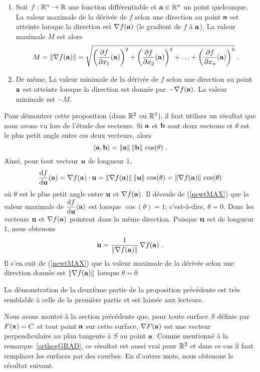{\begin{focus}{\prp}
\begin{enumerate}
\item Soit $f:\mathbb{R}^n\rightarrow \mathbb{R}$ une fonction différentiable et
$\mathbf{a} \in \mathbb{R}^n$ un point quelconque.  La valeur maximale de la dérivée de
$f$ selon une direction au point $\mathbf{a}$ est atteinte lorsque la direction
est $\nabla f(\mathbf{a})$ (le gradient de $f$ à $\mathbf{a}$).  La valeur maximale
$M$ est alors
\[
M = \|\nabla f(\mathbf{a}) \| =
\sqrt{\left(\frac{\partial f}{\partial x_1}(\mathbf{a})\right)^2 +
\left(\frac{\partial f}{\partial x_2}(\mathbf{a})\right)^2 + \ldots +
\left(\frac{\partial f}{\partial x_n}(\mathbf{a})\right)^2 } \; .
\]
\item De même, La valeur minimale de la dérivée de $f$ selon une direction au
point $\mathbf{a}$ est atteinte lorsque la direction est donnée par
$-\nabla f(\mathbf{a})$.  La valeur minimale est $-M$.
\end{enumerate}
\label{SteepestG}
\end{focus}

Pour démontrer cette proposition (dans $\mathbb{R}^2$ ou $\mathbb{R}^3$), il faut utiliser
un résultat que nous avons vu lors de l'étude des vecteurs.  Si $\mathbf{a}$ et
$\mathbf{b}$ sont deux vecteurs et $\theta$ est le plus petit angle entre ces
deux vecteurs, alors
\[
\left\langle{\mathbf{a}} , {\mathbf{b}}\right\rangle = \|\mathbf{a}\|\,\|\mathbf{b}\| \, \cos(\theta) \; .
\]
Ainsi, pour tout vecteur $\mathbf{u}$ de longueur $1$,
\begin{equation}\label{newtMAX}
\frac{\mathrm{d}f}{\mathrm{d}\mathbf{u}}(\mathbf{a}) = \nabla f(\mathbf{a}) \cdot \mathbf{u}
=\|\nabla f(\mathbf{a})\|\,\|\mathbf{u}\|\,\cos(\theta)
=\|\nabla f(\mathbf{a})\|\,\cos(\theta)
\end{equation}
où $\theta$ est le plus petit angle entre $\mathbf{u}$ et $\nabla f(\mathbf{a})$.
Il découle de (\ref{newtMAX}) que la valeur maximale de
$\displaystyle \frac{\mathrm{d}f}{\mathrm{d}\mathbf{u}}(\mathbf{a})$ est lorsque
$\cos(\theta)=1$; c'est-à-dire, $\theta =0$.  Donc les vecteurs
$\mathbf{u}$ et $\nabla f(\mathbf{a})$ pointent dans la même
direction.  Puisque $\mathbf{u}$ est de longueur $1$, nous obtenons
\[
\mathbf{u} = \frac{1}{\|\nabla f(\mathbf{a})\|}\,\nabla f(\mathbf{a}) \; .
\]
Il s'en suit de (\ref{newtMAX}) que la valeur maximale de la dérivée
selon une direction donnée est $\|\nabla f(\mathbf{a})\|$ lorsque $\theta = 0$

La démonstration de la deuxième partie de la proposition précédente est très
semblable à celle de la première partie et est laissée aux lecteurs.

Nous avons montré à la section précédente que, pour toute surface $S$
définie par $F(\mathbf{x})=C$ et tout point $\mathbf{a}$ sur cette surface,
$\nabla F(\mathbf{a})$ est une vecteur perpendiculaire au plan tangente à $S$ au
point $\mathbf{a}$.  Comme mentionné à la remarque~\ref{orthogGRAD}, ce
résultat est aussi vrai pour $\mathbb{R}^2$ et dans ce cas il faut
remplacer les surfaces par des courbes.  En d'autres mots, nous
obtenons le résultat suivant.

}
